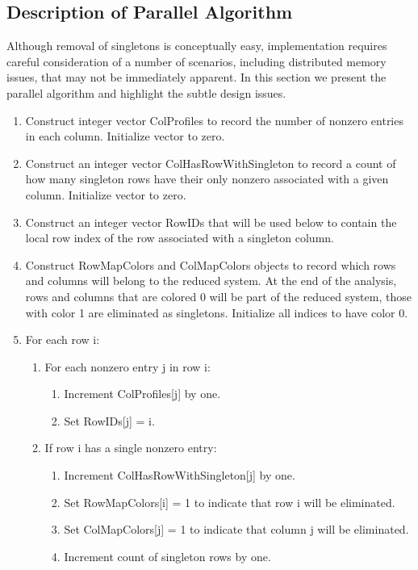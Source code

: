 \subsection{Description of Parallel Algorithm}

Although removal of singletons is conceptually easy, implementation requires careful
consideration of a number of scenarios, including distributed memory issues,
that may not be immediately apparent.  In this section we present the parallel algorithm
and highlight the subtle design issues.

\begin{enumerate}
\item Construct integer vector ColProfiles to record the number of nonzero entries in each
column. Initialize vector to zero.
\item Construct an integer vector ColHasRowWithSingleton to record a count of how many
singleton rows have their only nonzero associated with a given column. Initialize vector
to zero.
\item Construct an integer vector RowIDs that will be used below to 
contain the local row index of the row associated with a singleton column.
\item Construct RowMapColors and ColMapColors objects to record which rows and columns
will belong to the reduced system.  At the end of the analysis, rows and columns that
are colored 0 will be part of the reduced system, those with color 1 are eliminated as
singletons. Initialize all indices to have color 0.
\item For each row i:
\begin{enumerate}
\item For each nonzero entry j in row i:
\begin{enumerate}
\item Increment ColProfiles[j] by one.
\item Set RowIDs[j] = i.
\end{enumerate}
\item If row i has a single nonzero entry:
\begin{enumerate}
\item Increment ColHasRowWithSingleton[j] by one.
\item Set RowMapColors[i] = 1 to indicate that row i will be eliminated.
\item Set ColMapColors[j] = 1 to indicate that column j will be eliminated.
\item Increment count of singleton rows by one.
\end{enumerate}
\end{enumerate}
\end{enumerate}
